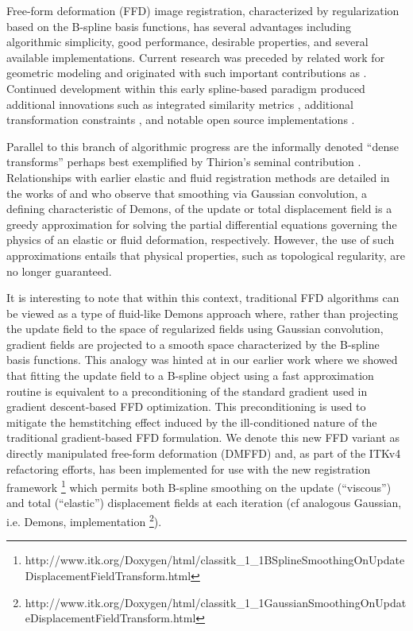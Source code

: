 \documentclass{frontiersSCNS}
\begin{document}
Free-form deformation (FFD) image registration, characterized by  regularization based on the B-spline basis functions, has several
advantages including algorithmic simplicity,
good performance, desirable properties, and several available
implementations.  Current research was
preceded by related work for
geometric modeling \citep{sederberg1986} and originated with such important
contributions as \cite{szeliski1997,thevenaz1998,rueckert1999}.
Continued development within this early spline-based paradigm produced additional innovations such as integrated similarity metrics \citep[e.g.][]{mattes2003}, additional transformation constraints \citep[e.g.][]{rohlfing2003}, and notable open source implementations \citep[e.g.][]{ibanez2005,klein2010,shackleford2010}.

Parallel to this branch of algorithmic progress are the informally
denoted ``dense transforms''
perhaps best exemplified by Thirion's seminal contribution \citep{thirion1998}.
Relationships with earlier elastic \citep{bajcsy1989,gee1993} and fluid \citep{christensen1996} registration methods are detailed in
the works of \cite{bro-nielsen1996} and \cite{pennec1999} who observe that
smoothing via Gaussian convolution, a defining characteristic of Demons,
of the update or total displacement
field is a greedy approximation for solving the partial differential equations governing
the physics of an elastic or fluid deformation, respectively.  However, the use of such
approximations entails that physical properties, such as topological
regularity, are no longer guaranteed.

It is interesting to note that within this context, traditional FFD algorithms
can be viewed as a type of fluid-like Demons approach
where, rather than projecting the update field to the space
of regularized fields using Gaussian convolution, gradient fields
are projected to a smooth space characterized by the B-spline
basis functions.  This analogy was hinted at in our earlier work \citep{tustison2009} where we showed that fitting the update field to a B-spline object using a fast approximation routine \citep{tustison2006} is equivalent to a preconditioning of the standard gradient used in gradient descent-based FFD optimization.
This preconditioning is used to mitigate the hemstitching effect induced by the ill-conditioned nature of the traditional gradient-based FFD formulation.  We denote
this new FFD variant as directly manipulated free-form deformation (DMFFD) and, 
as part of the ITKv4 refactoring efforts, has been implemented for use with the new
registration framework%
\footnote{
http://www.itk.org/Doxygen/html/classitk\_1\_1BSplineSmoothingOnUpdateDisplacementFieldTransform.html
}
which permits both B-spline smoothing on the update (``viscous'') and total (``elastic'')
displacement fields at each iteration (cf
analogous Gaussian, i.e. Demons, implementation%
\footnote{
http://www.itk.org/Doxygen/html/classitk\_1\_1GaussianSmoothingOnUpdateDisplacementFieldTransform.html
}).
\end{document}
